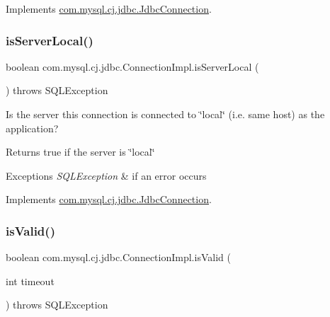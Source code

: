 Implements \mbox{\hyperlink{interfacecom_1_1mysql_1_1cj_1_1jdbc_1_1_jdbc_connection_a90906591d933e0d9f10dbb9db6b5a83a}{com.\+mysql.\+cj.\+jdbc.\+Jdbc\+Connection}}.

\mbox{\label{classcom_1_1mysql_1_1cj_1_1jdbc_1_1_connection_impl_a9f0926c4f30516633878b4315f7c073c}} 
\subsubsection{\texorpdfstring{is\+Server\+Local()}{isServerLocal()}}
{\footnotesize\ttfamily boolean com.\+mysql.\+cj.\+jdbc.\+Connection\+Impl.\+is\+Server\+Local (\begin{DoxyParamCaption}{ }\end{DoxyParamCaption}) throws S\+Q\+L\+Exception}

Is the server this connection is connected to \char`\"{}local\char`\"{} (i.\+e. same host) as the application?

\begin{DoxyReturn}{Returns}
true if the server is \char`\"{}local\char`\"{} 
\end{DoxyReturn}

\begin{DoxyExceptions}{Exceptions}
{\em S\+Q\+L\+Exception} & if an error occurs \\
\hline
\end{DoxyExceptions}


Implements \mbox{\hyperlink{interfacecom_1_1mysql_1_1cj_1_1jdbc_1_1_jdbc_connection_a4418f89cdbd768f892b6ef7823107921}{com.\+mysql.\+cj.\+jdbc.\+Jdbc\+Connection}}.

\mbox{\label{classcom_1_1mysql_1_1cj_1_1jdbc_1_1_connection_impl_a51c33076411dab0f4d9a6b73b2081637}} 
\subsubsection{\texorpdfstring{is\+Valid()}{isValid()}}
{\footnotesize\ttfamily boolean com.\+mysql.\+cj.\+jdbc.\+Connection\+Impl.\+is\+Valid (\begin{DoxyParamCaption}\item[{int}]{timeout }\end{DoxyParamCaption}) throws S\+Q\+L\+Exception}

